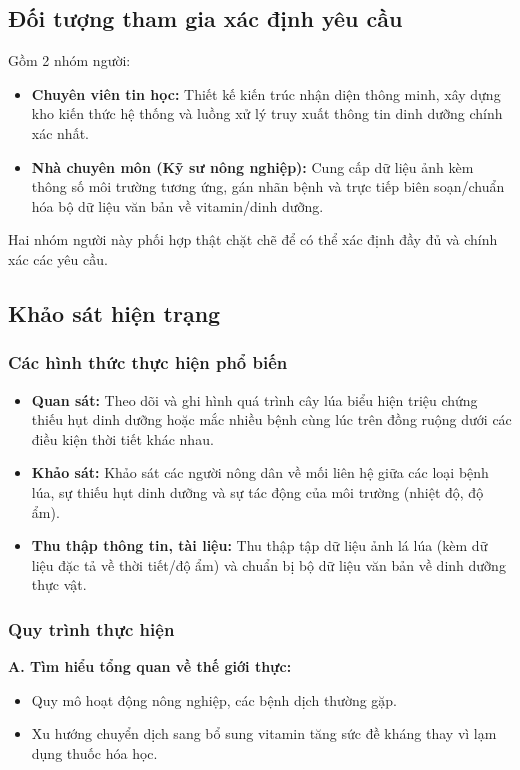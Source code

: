 \documentclass[12pt,a4paper]{article}
\begin{document}
\subsection{Đối tượng tham gia xác định yêu cầu}
Gồm 2 nhóm người:
\begin{itemize}
    \item \textbf{Chuyên viên tin học:} Thiết kế kiến trúc nhận diện thông minh, xây dựng kho kiến thức hệ thống và luồng xử lý truy xuất thông tin dinh dưỡng chính xác nhất.
    \item \textbf{Nhà chuyên môn (Kỹ sư nông nghiệp):} Cung cấp dữ liệu ảnh kèm thông số môi trường tương ứng, gán nhãn bệnh và trực tiếp biên soạn/chuẩn hóa bộ dữ liệu văn bản về vitamin/dinh dưỡng.
\end{itemize}
Hai nhóm người này phối hợp thật chặt chẽ để có thể xác định đầy đủ và chính xác các yêu cầu.

\hrulefill

\subsection{Khảo sát hiện trạng}
\subsubsection{Các hình thức thực hiện phổ biến}
\begin{itemize}
    \item \textbf{Quan sát:} Theo dõi và ghi hình quá trình cây lúa biểu hiện triệu chứng thiếu hụt dinh dưỡng hoặc mắc nhiều bệnh cùng lúc trên đồng ruộng dưới các điều kiện thời tiết khác nhau.
    \item \textbf{Khảo sát:} Khảo sát các người nông dân về mối liên hệ giữa các loại bệnh lúa, sự thiếu hụt dinh dưỡng và sự tác động của môi trường (nhiệt độ, độ ẩm).
    \item \textbf{Thu thập thông tin, tài liệu:} Thu thập tập dữ liệu ảnh lá lúa (kèm dữ liệu đặc tả về thời tiết/độ ẩm) và chuẩn bị bộ dữ liệu văn bản về dinh dưỡng thực vật.
\end{itemize}

\subsubsection{Quy trình thực hiện}
\textbf{A. Tìm hiểu tổng quan về thế giới thực:}
\begin{itemize}
    \item Quy mô hoạt động nông nghiệp, các bệnh dịch thường gặp.
    \item Xu hướng chuyển dịch sang bổ sung vitamin tăng sức đề kháng thay vì lạm dụng thuốc hóa học.
\end{itemize}
\end{document}
